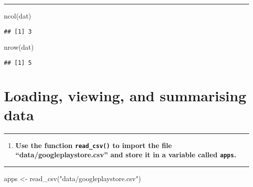 \documentclass[
]{article}
\newenvironment{Shaded}{\begin{snugshade}}{\end{snugshade}}
\newcommand{\FunctionTok}[1]{\textcolor[rgb]{0.00,0.00,0.00}{#1}}
\newcommand{\NormalTok}[1]{#1}
\newcommand{\OtherTok}[1]{\textcolor[rgb]{0.56,0.35,0.01}{#1}}
\newcommand{\StringTok}[1]{\textcolor[rgb]{0.31,0.60,0.02}{#1}}
\providecommand{\tightlist}{%
  \setlength{\itemsep}{0pt}\setlength{\parskip}{0pt}}
\begin{document}
\begin{center}\rule{0.5\linewidth}{0.5pt}\end{center}

\begin{Shaded}
\begin{Highlighting}[]
\FunctionTok{ncol}\NormalTok{(dat)}
\end{Highlighting}
\end{Shaded}

\begin{verbatim}
## [1] 3
\end{verbatim}

\begin{Shaded}
\begin{Highlighting}[]
\FunctionTok{nrow}\NormalTok{(dat)}
\end{Highlighting}
\end{Shaded}

\begin{verbatim}
## [1] 5
\end{verbatim}

\hypertarget{loading-viewing-and-summarising-data}{%
\section{Loading, viewing, and summarising
data}\label{loading-viewing-and-summarising-data}}

\begin{center}\rule{0.5\linewidth}{0.5pt}\end{center}

\begin{enumerate}
\def\labelenumi{\arabic{enumi}.}
\setcounter{enumi}{5}
\tightlist
\item
  \textbf{Use the function \texttt{read\_csv()} to import the file
  ``data/googleplaystore.csv'' and store it in a variable called
  \texttt{apps}.}
\end{enumerate}

\begin{center}\rule{0.5\linewidth}{0.5pt}\end{center}

\begin{Shaded}
\begin{Highlighting}[]
\NormalTok{apps }\OtherTok{\textless{}{-}} \FunctionTok{read\_csv}\NormalTok{(}\StringTok{"data/googleplaystore.csv"}\NormalTok{)}
\end{Highlighting}
\end{Shaded}
\end{document}

